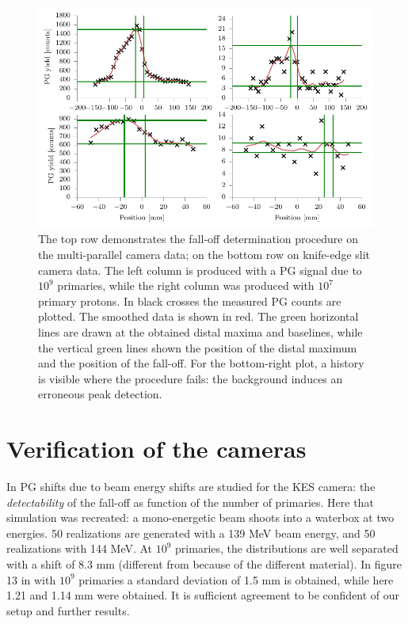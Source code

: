 \documentclass[a4paper,english]{article}
\begin{document}
\begin{figure}[htp]
  \centering
  \includegraphics[width=0.9\linewidth]{fopproc}
  \caption{The top row demonstrates the fall-off determination procedure on the multi-parallel camera data; on the bottom row on knife-edge slit camera data. The left column is produced with a PG signal due to $10^9$ primaries, while the right column was produced with $10^7$ primary protons. In black crosses the measured PG counts are plotted. The smoothed data is shown in red. The green horizontal lines are drawn at the obtained distal maxima and baselines, while the vertical green lines shown the position of the distal maximum and the position of the fall-off. For the bottom-right plot, a history is visible where the procedure fails: the background induces an erroneous peak detection.}
  \label{fig:our-fit}
\end{figure}

\section{Verification of the cameras}

In \cite{Priegnitz2015} PG shifts due to beam energy shifts are studied for the KES camera: the \emph{detectability} of the fall-off as function of the number of primaries. Here that simulation was recreated: a mono-energetic beam shoots into a waterbox at two energies. 50 realizations are generated with a 139 MeV beam energy, and 50 realizations with 144 MeV. At $10^9$ primaries, the distributions are well separated with a shift of 8.3 mm (different from \cite{Priegnitz2015} because of the different material). In figure 13 in \cite{Perali2014} with $10^9$ primaries a standard deviation of 1.5 mm is obtained, while here 1.21 and 1.14 mm were obtained. It is sufficient agreement to be confident of our setup and further results.
\end{document}
